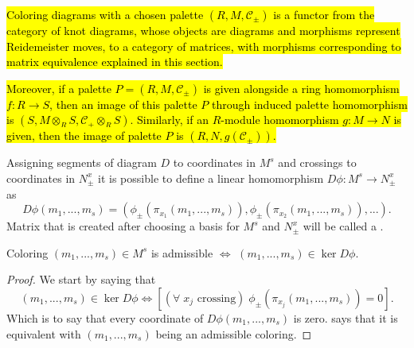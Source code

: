 \hl{Coloring diagrams with a chosen palette $(R, M, \mathcal{C}_\pm)$ is a functor from the category of knot diagrams, whose objects are diagrams and morphisms represent Reidemeister moves, to a category of matrices, with morphisms corresponding to matrix equivalence explained in this section.}

\hl{Moreover, if a palette $P=(R, M, \mathcal{C}_\pm)$ is given alongside a ring homomorphism $f:R\to S$, then an image of this palette $P$ through induced palette homomorphism is $(S, M\otimes_R S, \mathcal{C}_\pm\otimes_R S)$. Similarly, if an $R$-module homomorphism $g:M\to N$ is given, then the image of palette $P$ is $(R, N, g(\mathcal{C}_\pm))$.}

\begin{definition}\label{def:color checking matrix}
  Assigning segments of diagram $D$ to coordinates in $M^s$ and crossings to coordinates in $N_\pm^x$ it is possible to define a linear homomorphism $D\phi:M^s\to N_\pm^x$  as
  $$D\phi(m_1,...,m_s)=(\phi_\pm(\pi_{x_1}(m_1,...,m_s)), \phi_\pm(\pi_{x_2}(m_1,...,m_s)),...).$$
  Matrix that is created after choosing a basis for $M^s$ and $N_\pm^x$ will be called a .
\end{definition}

\begin{proposition}\label{admissible coloring is kernel}
  Coloring $(m_1,...,m_s)\in M^s$ is admissible $\iff$ $(m_1,...,m_s)\in\ker D\phi$.
\end{proposition}

\begin{proof}
  We start by saying that 
  $$(m_1,..., m_s)\in\ker D\phi\iff [(\forall\;x_j\text{ crossing})\;\phi_\pm(\pi_{x_j}(m_1,..., m_s))=0].$$
  Which is to say that every coordinate of $D\phi(m_1,..., m_s)$ is zero.  says that it is equivalent with $(m_1,..., m_s)$ being an admissible coloring.
\end{proof}

